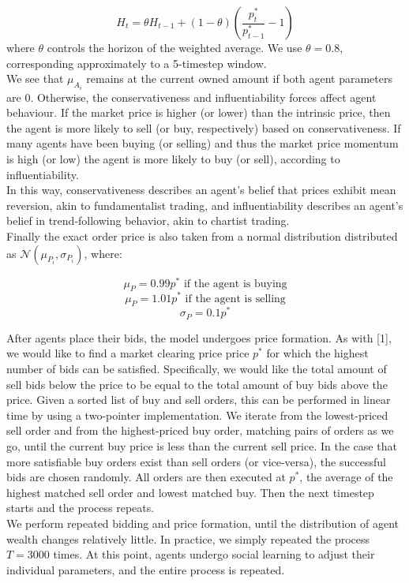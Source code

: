 \documentclass[11pt]{article}
\begin{document}
\begin{equation}
H_t = \theta H_{t-1} + (1 - \theta)(\frac{p^*_t}{p^*_{t-1}} - 1)
\end{equation}
where $\theta$ controls the horizon of the weighted average. We use $\theta=0.8$, corresponding approximately to a 5-timestep window. \\
We see that $\mu_{A_i}$ remains at the current owned amount if both agent parameters are $0$. Otherwise, the conservativeness and influentiability forces affect agent behaviour. If the market price is higher (or lower) than the intrinsic price, then the agent is more likely to sell (or buy, respectively) based on conservativeness. If many agents have been buying (or selling) and thus the market price momentum is high (or low) the agent is more likely to buy (or sell), according to influentiability.\\
In this way, conservativeness describes an agent's belief that prices exhibit mean reversion, akin to fundamentalist trading, and influentiability describes an agent's belief in trend-following behavior, akin to chartist trading. \\
Finally the exact order price is also taken from a normal distribution distributed as $\mathcal{N}(\mu_{P_i}, \sigma_{P_i})$, where:

\begin{equation}
\mu_P = 0.99 p^* \text{ if the agent is buying}
\end{equation}
\begin{equation}
\mu_P = 1.01 p^* \text{ if the agent is selling}
\end{equation}
\begin{equation}
\sigma_P = 0.1p^*
\end{equation}

After agents place their bids, the model undergoes price formation. As with [1], we would like to find a market clearing price price $p^*$ for which the highest number of bids can be satisfied. Specifically, we would like the total amount of sell bids below the price to be equal to the total amount of buy bids above the price. Given a sorted list of buy and sell orders, this can be performed in linear time by using a two-pointer implementation. We iterate from the lowest-priced sell order and from the highest-priced buy order, matching pairs of orders as we go, until the current buy price is less than the current sell price. In the case that more satisfiable buy orders exist than sell orders (or vice-versa), the successful bids are chosen randomly. All orders are then executed at $p^*$, the average of the highest matched sell order and lowest matched buy. Then the next timestep starts and the process repeats. \\
We perform repeated bidding and price formation, until the distribution of agent wealth changes relatively little. In practice, we simply repeated the process $T=3000$ times. At this point, agents undergo social learning to adjust their individual parameters, and the entire process is repeated. \\
\end{document}
